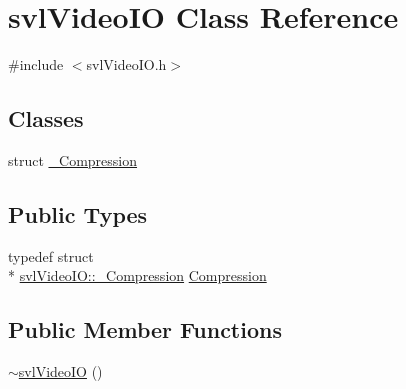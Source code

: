 \hypertarget{classsvl_video_i_o}{\section{svl\-Video\-I\-O Class Reference}
\label{classsvl_video_i_o}
}


{\ttfamily \#include $<$svl\-Video\-I\-O.\-h$>$}

\subsection*{Classes}
\begin{DoxyCompactItemize}
\item 
struct \hyperlink{structsvl_video_i_o_1_1___compression}{\-\_\-\-Compression}
\end{DoxyCompactItemize}
\subsection*{Public Types}
\begin{DoxyCompactItemize}
\item 
typedef struct \\*
\hyperlink{structsvl_video_i_o_1_1___compression}{svl\-Video\-I\-O\-::\-\_\-\-Compression} \hyperlink{classsvl_video_i_o_a932d071ec9be4fefde824ab9b9125282}{Compression}
\end{DoxyCompactItemize}
\subsection*{Public Member Functions}
\begin{DoxyCompactItemize}
\item 
\hyperlink{classsvl_video_i_o_af736c01b3a1a65156b0669850be83979}{$\sim$svl\-Video\-I\-O} ()
\end{DoxyCompactItemize}
